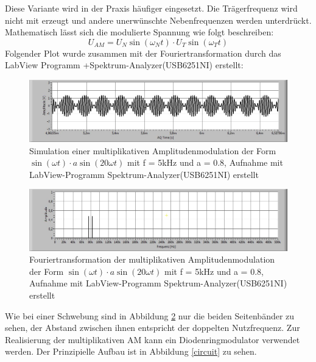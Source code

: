 		Diese Variante wird in der Praxis häufiger eingesetzt. Die Trägerfrequenz wird nicht mit erzeugt und andere unerwünschte Nebenfrequenzen werden unterdrückt. Mathematisch lässt sich die modulierte Spannung wie folgt beschreiben:
		\begin{equation}
			U_{AM} = U_N\sin (\omega_N t)\cdot U_T\sin(\omega_T t)
		\end{equation}
		Folgender Plot wurde zusammen mit der Fouriertransformation durch das LabView Programm +Spektrum-Analyzer(USB6251NI) erstellt:

		\begin{figure}[H]	
			\center	
			\includegraphics[scale = 0.35]{messwerte/multi.jpg}
			\caption{\centering Simulation einer multiplikativen Amplitudenmodulation der Form $\sin (\omega t) \cdot a \sin (20 \omega t)$ mit f = 5kHz und a = 0.8, Aufnahme mit LabView-Programm Spektrum-Analyzer(USB6251NI) erstellt} %
			\label{multi}	
		\end{figure}

		\begin{figure}[H]	
			\center	
			\includegraphics[scale = 0.35]{messwerte/ft-multi.jpg}	
			\caption{\centering Fouriertransformation der multiplikativen Amplitudenmodulation der Form $\sin (\omega t) \cdot a \sin (20 \omega t)$ mit f = 5kHz und a = 0.8, Aufnahme mit LabView-Programm Spektrum-Analyzer(USB6251NI) erstellt} %
			\label{ft_multi}	
		\end{figure}

		Wie bei einer Schwebung sind in Abbildung \ref{ft_multi} nur die beiden Seitenbänder zu sehen, der Abstand zwischen ihnen entspricht der doppelten Nutzfrequenz. Zur Realisierung der multiplikativen AM kann ein Diodenringmodulator verwendet werden. Der Prinzipielle Aufbau ist in Abbildung \ref{circuit} zu sehen.\cite{unterlagen}

